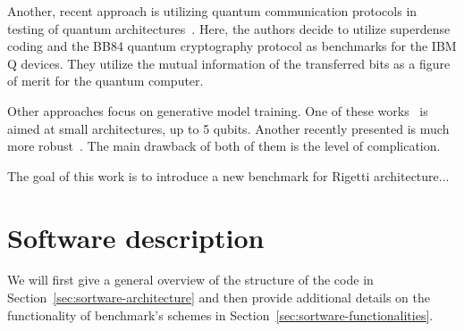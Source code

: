 \documentclass[preprint,12pt, a4paper]{elsarticle}
\newcommand{\1}{{\rm 1\hspace{-0.9mm}l}}
\begin{document}
Another, recent approach is utilizing quantum communication protocols in testing
of quantum architectures~\cite{zhukov2019quantum}. Here, the authors decide to
utilize superdense coding and the BB84 quantum cryptography protocol as
benchmarks for the IBM Q devices. They utilize the mutual information of the
transferred bits as a figure of merit for the quantum computer.

Other approaches focus on generative model training. One of these
works~\cite{hamilton2018generative} is aimed at small architectures, up to 5
qubits. Another recently presented is much more
robust~\cite{benedetti2018generative}. The main drawback of both of them is the
level of complication.



The goal of this work is to introduce a new benchmark for Rigetti 
architecture...


\label{}



\section{Software description}
\label{}

We will first give a general overview of the structure of the code in 
Section~\ref{sec:sortware-architecture} and then provide additional details on 
the functionality of benchmark's schemes  in 
Section~\ref{sec:sortware-functionalities}.
\end{document}
